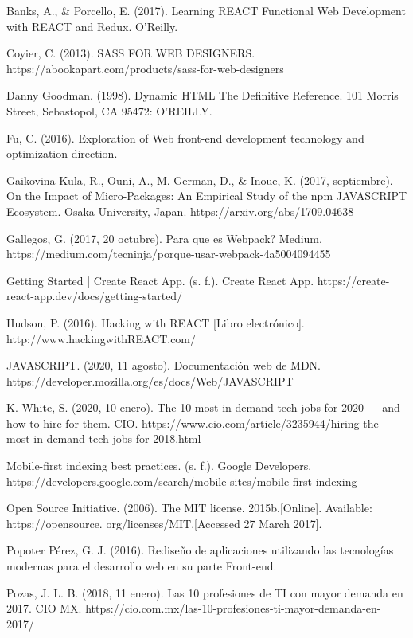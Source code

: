 \begin{thebibliography}{100} 

 Banks, A., & Porcello, E. (2017). Learning REACT Functional Web Development with REACT and Redux. O’Reilly.

 Coyier, C. (2013). SASS FOR WEB DESIGNERS. https://abookapart.com/products/sass-for-web-designers

 Danny Goodman. (1998). Dynamic HTML The Definitive Reference. 101 Morris Street, Sebastopol, CA 95472: O'REILLY.

 Fu, C. (2016). Exploration of Web front-end development technology and optimization direction.

\bibitem{} Gaikovina Kula, R., Ouni, A., M. German, D., & Inoue, K. (2017, septiembre). On the Impact of Micro-Packages: An Empirical Study of the npm JAVASCRIPT Ecosystem. Osaka University, Japan. https://arxiv.org/abs/1709.04638

 Gallegos, G. (2017, 20 octubre). Para que es Webpack? Medium. https://medium.com/tecninja/porque-usar-webpack-4a5004094455

 Getting Started | Create React App. (s. f.). Create React App. https://create-react-app.dev/docs/getting-started/

\bibitem{} Hudson, P. (2016). Hacking with REACT [Libro electrónico]. http://www.hackingwithREACT.com/

 JAVASCRIPT. (2020, 11 agosto). Documentación web de MDN. https://developer.mozilla.org/es/docs/Web/JAVASCRIPT

\bibitem{} K. White, S. (2020, 10 enero). The 10 most in-demand tech jobs for 2020 — and how to hire for them. CIO. https://www.cio.com/article/3235944/hiring-the-most-in-demand-tech-jobs-for-2018.html

 Mobile-first indexing best practices. (s. f.). Google Developers. https://developers.google.com/search/mobile-sites/mobile-first-indexing


\bibitem{} Open Source Initiative. (2006). The MIT license. 2015b.[Online]. Available: https://opensource. org/licenses/MIT.[Accessed 27 March 2017].


 Popoter Pérez, G. J. (2016). Rediseño de aplicaciones utilizando las tecnologías modernas para el desarrollo web en su parte Front-end.


\bibitem{} Pozas, J. L. B. (2018, 11 enero). Las 10 profesiones de TI con mayor demanda en 2017. CIO MX. https://cio.com.mx/las-10-profesiones-ti-mayor-demanda-en-2017/


\end{thebibliography}
